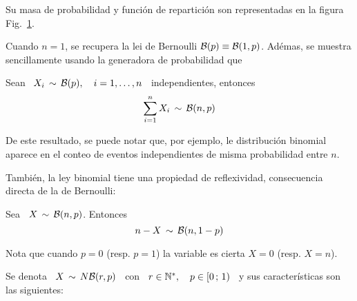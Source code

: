Su masa  de probabilidad  y funci\'on de  repartici\'on son representadas  en la
figura Fig.~\ref{Fig:MP:Binomial}.
%
\begin{figure}[h!]
\begin{center}  \end{center}
%
\label{Fig:MP:Binomial}
\end{figure}

Cuando  $n  = 1$,  se  recupera  la lei  de  Bernoulli  $\mathcal{B}(p) \equiv  \mathcal{B}(1,p)$.
Ad\'emas, se muestra  sencillamente usando la generadora de  probabilidad que
%
\begin{lema}
\label{Lem:BinomilaSumaBernoulli}
%
  Sean \  $X_i \,  \sim \, \mathcal{B}(p),  \quad i  = 1, \ldots  , n$  \ independientes,
  entonces
  \[
  \sum_{i=1}^n X_i \, \sim \, \mathcal{B}(n,p)
  \]
\end{lema}
%
De este resultado,  se puede notar que, por  ejemplo, le distribuci\'on binomial
aparece en el conteo de eventos independientes de misma probabilidad entre $n$.

Tambi\'en,  la ley binomial  tiene una  propiedad de  reflexividad, consecuencia
directa de la de Bernoulli:
%
\begin{lema}[Reflexividad]
\label{Lem:MP:ReflexividadBinomial}
%
  Sea \ $X \, \sim \, \mathcal{B}(n,p)$. Entonces
  \[
  n-X \, \sim \, \mathcal{B}(n,1-p)
  \]
\end{lema}

Nota que cuando $p = 0$ (resp. $p = 1$) la variable es cierta $X = 0$ (resp.  $X
= n$).



\label{Sssec:MP:BinomialNegativa}

Se denota \ $X \, \sim \, N\mathcal{B}(r,p)$ \  con \ $r \in \mathbb{N}^*, \quad p \in [0 \, ; \, 1)$ \ y sus caracter\'isticas son las siguientes:

